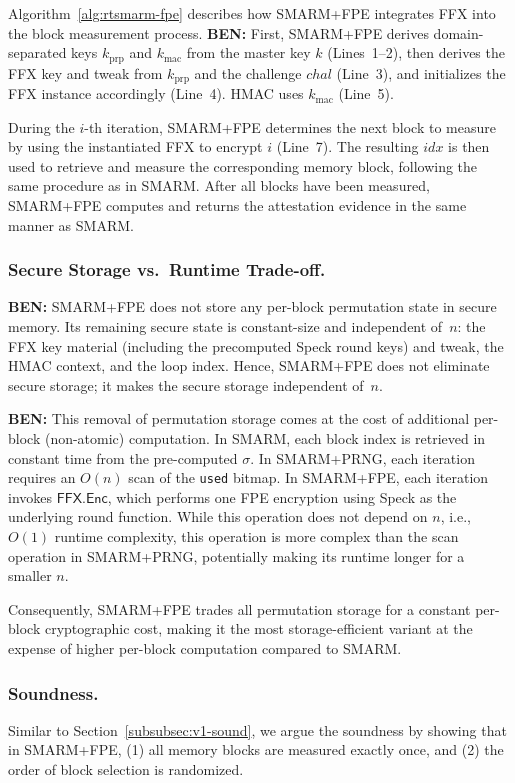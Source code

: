 \documentclass{ieeeaccess}
\DeclareRobustCommand{\ben}[1]{{\color{BENcolor}\textbf{BEN:} #1}}
\newcommand{\rtsmarmone}{SMARM+PRNG\xspace}
\newcommand{\rtsmarmtwo}{SMARM+FPE\xspace}
\begin{document}
Algorithm~\ref{alg:rtsmarm-fpe} describes how \rtsmarmtwo integrates FFX into the block measurement process.
\ben{First, \rtsmarmtwo derives domain-separated keys $k_{\mathrm{prp}}$ and $k_{\mathrm{mac}}$ from the master key $k$ (Lines~1--2), then derives the FFX key and tweak from $k_{\mathrm{prp}}$ and the challenge $chal$ (Line~3), and initializes the FFX instance accordingly (Line~4). HMAC uses $k_{\mathrm{mac}}$ (Line~5).}

During the $i$-th iteration, \rtsmarmtwo determines the next block to measure by using the instantiated FFX to encrypt $i$ (Line~7).
The resulting $idx$ is then used to retrieve and measure the corresponding memory block, following the same procedure as in SMARM.
After all blocks have been measured, \rtsmarmtwo computes and returns the attestation evidence in the same manner as SMARM.

\subsubsection{Secure Storage vs.\ Runtime Trade-off.}
\ben{\rtsmarmtwo does not store any per-block permutation state in secure memory.
Its remaining secure state is constant-size and independent of~$n$: the FFX key material (including the precomputed Speck round keys) and tweak, the HMAC context, and the loop index.
Hence, \rtsmarmtwo does not eliminate secure storage; it makes the secure storage independent of~$n$.}

\ben{This removal of permutation storage} comes at the cost 
of additional per-block (non-atomic) computation.
In SMARM, each block index is retrieved in constant time 
from the pre-computed $\sigma$.
In \rtsmarmone, each iteration requires an $O(n)$ scan of 
the \texttt{used} bitmap.
In \rtsmarmtwo, each iteration invokes 
$\mathsf{FFX.Enc}$, which performs one FPE encryption using Speck as the underlying round function. 
While this operation does not depend on $n$, i.e., $O(1)$ runtime complexity, this operation is more complex than the scan operation in \rtsmarmone, potentially making its runtime longer for a smaller $n$.

Consequently, \rtsmarmtwo trades all permutation storage 
for a constant per-block cryptographic cost, making it 
the most storage-efficient variant at the expense of higher per-block computation compared to SMARM.

\subsubsection{Soundness.}
Similar to Section~\ref{subsubsec:v1-sound}, we argue the soundness by showing that in \rtsmarmtwo, (1) all memory blocks are measured exactly once, and (2) the order of block selection is randomized.
\end{document}

